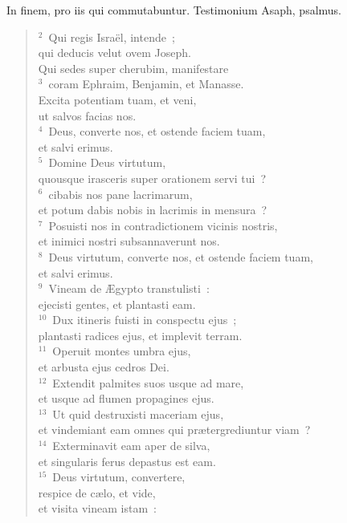 \bchapter
\lettrine[lines=3,image=true,loversize=0.05,lraise=-0.03]{I}{}n finem, pro iis qui commutabuntur. Testimonium Asaph, psalmus.
\begin{flushleft}\begin{verse}\vspace{6pt}${}^{2}$~Qui regis Isra\"el, intende~;\\ qui deducis velut ovem Joseph.\\ Qui sedes super cherubim, manifestare\\
${}^{3}$~coram Ephraim, Benjamin, et Manasse.\\ Excita potentiam tuam, et veni,\\ ut salvos facias nos.\\
${}^{4}$~Deus, converte nos, et ostende faciem tuam,\\ et salvi erimus.\\
${}^{5}$~Domine Deus virtutum,\\ quousque irasceris super orationem servi tui~?\\
${}^{6}$~cibabis nos pane lacrimarum,\\ et potum dabis nobis in lacrimis in mensura~?\\
${}^{7}$~Posuisti nos in contradictionem vicinis nostris,\\ et inimici nostri subsannaverunt nos.\\
${}^{8}$~Deus virtutum, converte nos, et ostende faciem tuam,\\ et salvi erimus.\\
${}^{9}$~Vineam de \AE gypto transtulisti~:\\ ejecisti gentes, et plantasti eam.\\
${}^{10}$~Dux itineris fuisti in conspectu ejus~;\\ plantasti radices ejus, et implevit terram.\\
${}^{11}$~Operuit montes umbra ejus,\\ et arbusta ejus cedros Dei.\\
${}^{12}$~Extendit palmites suos usque ad mare,\\ et usque ad flumen propagines ejus.\\
${}^{13}$~Ut quid destruxisti maceriam ejus,\\ et vindemiant eam omnes qui pr\ae tergrediuntur viam~?\\
${}^{14}$~Exterminavit eam aper de silva,\\ et singularis ferus depastus est eam.\\
${}^{15}$~Deus virtutum, convertere,\\ respice de c\ae lo, et vide,\\ et visita vineam istam~:\\

\end{verse}
\end{flushleft}
